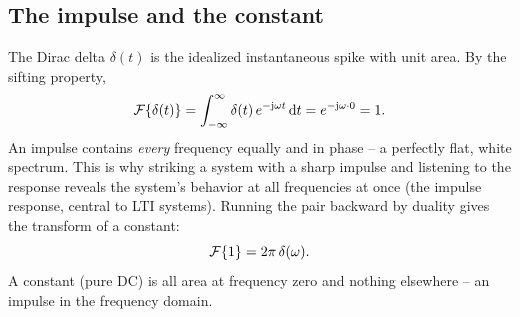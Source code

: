 \subsection{The impulse and the constant}
The Dirac delta $\delta(t)$ is the idealized instantaneous spike with unit area. By the
sifting property,
\begin{equation}
\mathcal{F}\{\delta(t)\} = \int_{-\infty}^{\infty}\delta(t)\,e^{-\mathrm{j}\omega t}\,\mathrm{d} t = e^{-\mathrm{j}\omega\cdot 0} = 1 .
\end{equation}
An impulse contains \emph{every} frequency equally and in phase -- a perfectly flat,
white spectrum. This is why striking a system with a sharp impulse and listening to the
response reveals the system's behavior at all frequencies at once (the impulse response,
central to LTI systems). Running the pair backward by duality gives the transform of a
constant:
\begin{equation}
\mathcal{F}\{1\} = 2\pi\,\delta(\omega) .
\end{equation}
A constant (pure DC) is all area at frequency zero and nothing elsewhere -- an impulse in
the frequency domain.

